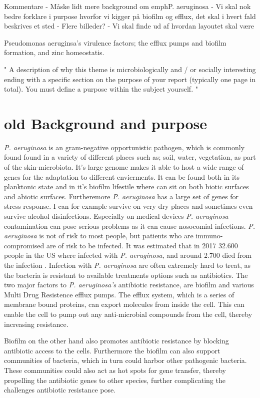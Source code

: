 Kommentare
- Måske lidt mere background om emph{P. aeruginosa}
- Vi skal nok bedre forklare i purpose hvorfor vi kigger på biofilm og efflux, det skal i hvert fald beskrives et sted
- Flere billeder?
- Vi skal finde ud af hvordan layoutet skal være



{Pseudomonas aeruginsa}'s virulence factors; the efflux pumps and biofilm formation, and zinc homeostatis.



" A description of why this theme is microbiologically and / or socially
interesting ending with a specific section on the purpose of your report (typically one page in
total). You must define a purpose within the subject yourself.  "


\section{old Background and purpose}
\textit{P. aeruginosa} is an gram-negative opportunistic pathogen, which is commonly found found in a variety of different places such as; soil, water, vegetation, as part of the skin-microbiota.
It's large genome makes it able to host a wide range of genes for the adaptation to different envierments. It can be found both in its planktonic state and in it's biofilm lifestile where can sit on both biotic surfaces and abiotic surfaces. Furtheremore \textit{P. aeruginosa} has a large set of genes for stress response. I can for example survive on very dry places  and sometimes even survive alcohol disinfections.
Especially on medical devices \textit{P. aeruginosa} contamination can pose serious problems as it can cause nosocomial infections. 
\textit{P. aeruginosa} is not of risk to most people, but patients who are immuno-compromised are of risk to be infected. It was estimated that in 2017 32.600 people in the US where infected with \textit{P. aeruginosa}, and around 2.700 died from the infection \cite{MULTIDRUG-RESISTANTAERUGINOSA}.
Infection with \textit{P. aeruginosa} are often extremely hard to treat, as the bacteria is resistant to available treatments options such as antibiotics. 
The two major factors to \textit{P. aeruginosa's} antibiotic resistance, are biofilm and various Multi Drug Resistence efflux pumps. The efflux system, which is a series of membrane bound proteins, can export molecules from inside the cell. This can enable the cell to pump out any anti-microbial compounds from the cell, thereby increasing resistance. 

Biofilm on the other hand also promotes antibiotic resistance by blocking antibiotic access to the cells. Furthermore the biofilm can also support communities of bacteria, which in turn could harbor other pathogenic bacteria. These communities could also act as hot spots for gene transfer, thereby propelling the antibiotic genes to other species, further complicating the challenges antibiotic resistance pose.

